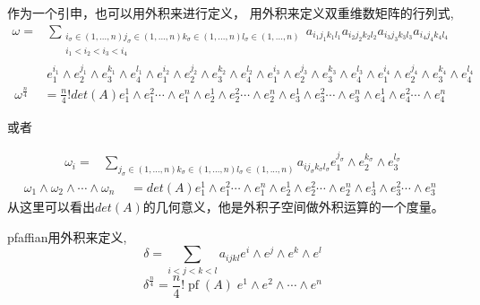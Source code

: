 \documentclass[twoside,a4paper,CCT]{cctart}   %
\begin{document}
作为一个引申，也可以用外积来进行定义，
用外积来定义双重维数矩阵的行列式,
\begin{equation}
\begin{aligned}
\omega=
& \sum_{\substack{i_{\sigma}\in {(1,...,n)} j_{\sigma}\in {(1,...,n)}k_{\sigma}\in {(1,...,n)}l_{\sigma}\in{(1,...,n)}\\ i_{1} < i_{2} < i_{3} < i_{4}}}a_{i_{1}j_{1}k_{1}l_{1}}a_{i_{2}j_{2}k_{2}l_{2}}a_{i_{3}j_{3}k_{3}l_{3}}a_{i_{4}j_{4}k_{4}l_{4}}\\
& e_{1}^{i_{1}} \wedge e_{2}^{j_{1}} \wedge e_{3}^{k_{1}} \wedge e_{4}^{l_{1}} \wedge e_{1}^{i_{2}} \wedge e_{2}^{j_{2}} \wedge e_{3}^{k_{2}} \wedge e_{4}^{l_{2}} \wedge e_{1}^{i_{3}} \wedge e_{2}^{j_{3}} \wedge e_{3}^{k_{3}} \wedge e_{4}^{l_{3}} \wedge e_{1}^{i_{4}} \wedge e_{2}^{j_{4}} \wedge e_{3}^{k_{4}} \wedge e_{4}^{l_{4}}
\end{aligned}\end{equation}
\begin{equation}
\omega^{\frac{n}{4}}
\begin{aligned}
& = \frac{n}{4}! det(A) e_{1}^1\wedge e_{1}^2 \cdots \wedge e_{1}^n \wedge e_{2}^1\wedge e_{2}^2 \cdots \wedge e_{2}^n
\wedge e_{3}^1\wedge e_{3}^2 \cdots \wedge e_{3}^n \wedge e_{4}^1\wedge e_{4}^2 \cdots \wedge e_{4}^n
\end{aligned}\end{equation}

或者

\begin{equation}
\begin{aligned}
\omega_{i}=
& \sum_{j_{\sigma}\in {(1,...,n)}k_{\sigma}\in {(1,...,n)}l_{\sigma}\in{(1,...,n)}}a_{ij_{\sigma}k_{\sigma}l_{\sigma}} e_{1}^{j_{\sigma}} \wedge e_{2}^{k_{\sigma}} \wedge e_{3}^{l_{\sigma}}
\end{aligned}\end{equation}
\begin{equation}
\omega_{1}\wedge\omega_{2}\wedge\cdots\wedge\omega_{n}
\begin{aligned}
& = det(A) e_{1}^1\wedge e_{1}^2 \cdots \wedge e_{1}^n \wedge e_{2}^1\wedge e_{2}^2 \cdots \wedge e_{2}^n
\wedge e_{3}^1\wedge e_{3}^2 \cdots \wedge e_{3}^n
\end{aligned}
\end{equation}
从这里可以看出$det(A)$的几何意义，他是外积子空间做外积运算的一个度量。

pfaffian用外积来定义,
\begin{equation}\delta=\sum_{i<j<k<l}a_{ijkl}e^{i} \wedge e^{j} \wedge e^{k} \wedge e^{l}\end{equation}
\begin{equation}\delta^{\frac{n}{4}} = \frac{n}{4}! \operatorname{pf}(A)\;e^1\wedge e^2\wedge\cdots\wedge e^{n}\end{equation}
\end{document}
